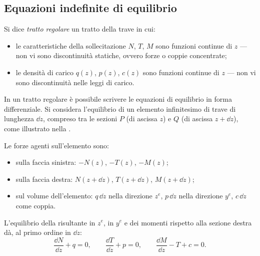 




\subsection{Equazioni indefinite di equilibrio}
\label{sec:eq_indefinite}

Si dice \emph{tratto regolare} un tratto della trave
in cui:
\begin{itemize}[nosep]
	\item le caratteristiche della sollecitazione
	$N$, $T$, $M$ sono funzioni continue di $z$
	--- non vi sono discontinuità statiche, ovvero
	forze o coppie concentrate;
	\item le densità di carico $q(z)$, $p(z)$,
	$c(z)$ sono funzioni continue di $z$ --- non
	vi sono discontinuità nelle leggi di carico.
\end{itemize}

In un tratto regolare è possibile scrivere le
equazioni di equilibrio in forma differenziale.
Si considera l'equilibrio di un elemento
infinitesimo di trave di lunghezza $\dd z$,
compreso tra le sezioni $P$ (di ascissa $z$) e
$Q$ (di ascissa $z + \dd z$), come illustrato
nella .







Le forze agenti sull'elemento sono:
\begin{itemize}[nosep]
	\item sulla faccia sinistra: $-N(z)$, $-T(z)$,
	$-M(z)$;
	\item sulla faccia destra: $N(z+\dd z)$,
	$T(z+\dd z)$, $M(z+\dd z)$;
	\item sul volume dell'elemento: $q\,\dd z$
	nella direzione $z^e$, $p\,\dd z$ nella
	direzione $y^e$, $c\,\dd z$ come coppia.
\end{itemize}

L'equilibrio della risultante in $z^e$, in $y^e$
e dei momenti rispetto alla sezione destra dà,
al primo ordine in $\dd z$:
\begin{equation}\label{eq:eq_indefinite}
	\boxed{\frac{\dd N}{\dd z} + q = 0,
		\qquad
		\frac{\dd T}{\dd z} + p = 0,
		\qquad
		\frac{\dd M}{\dd z} - T + c = 0.}
\end{equation}

